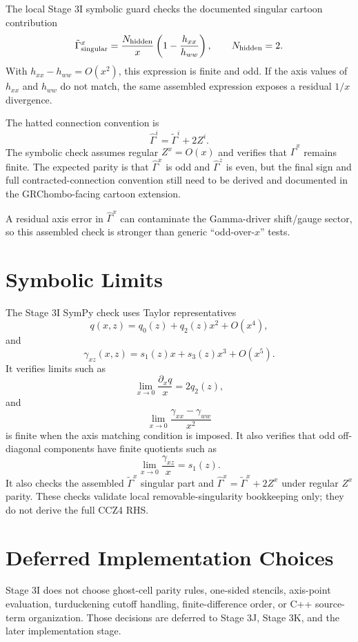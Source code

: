 \documentclass[11pt]{article}
\begin{document}
The local Stage 3I symbolic guard checks the documented singular cartoon
contribution
\[
  \tilde{\Gamma}^x_{\rm singular}
  =
  \frac{N_{\rm hidden}}{x}
  \left(1-\frac{h_{xx}}{h_{ww}}\right),
  \qquad
  N_{\rm hidden}=2.
\]
With \(h_{xx}-h_{ww}=O(x^2)\), this expression is finite and odd. If the
axis values of \(h_{xx}\) and \(h_{ww}\) do not match, the same assembled
expression exposes a residual \(1/x\) divergence.

The hatted connection convention is
\[
  \hat{\Gamma}^i
  =
  \tilde{\Gamma}^i+2Z^i.
\]
The symbolic check assumes regular \(Z^x=O(x)\) and verifies that
\(\hat{\Gamma}^x\) remains finite. The expected parity is that
\(\hat{\Gamma}^x\) is odd and \(\hat{\Gamma}^z\) is even, but the final sign
and full contracted-connection convention still need to be derived and
documented in the GRChombo-facing cartoon extension.

A residual axis error in \(\hat{\Gamma}^x\) can contaminate the Gamma-driver
shift/gauge sector, so this assembled check is stronger than generic
``odd-over-\(x\)'' tests.

\section{Symbolic Limits}

The Stage 3I SymPy check uses Taylor representatives
\[
  q(x,z)=q_0(z)+q_2(z)x^2+O(x^4),
\]
and
\[
  \gamma_{xz}(x,z)=s_1(z)x+s_3(z)x^3+O(x^5).
\]
It verifies limits such as
\[
  \lim_{x\to0}\frac{\partial_x q}{x}=2q_2(z),
\]
and
\[
  \lim_{x\to0}\frac{\gamma_{xx}-\gamma_{ww}}{x^2}
\]
is finite when the axis matching condition is imposed. It also verifies that
odd off-diagonal components have finite quotients such as
\[
  \lim_{x\to0}\frac{\gamma_{xz}}{x}=s_1(z).
\]
It also checks the assembled \(\tilde{\Gamma}^x\) singular part and
\(\hat{\Gamma}^x=\tilde{\Gamma}^x+2Z^x\) under regular \(Z^x\) parity. These
checks validate local removable-singularity bookkeeping only; they do not
derive the full CCZ4 RHS.

\section{Deferred Implementation Choices}

Stage 3I does not choose ghost-cell parity rules, one-sided stencils,
axis-point evaluation, turduckening cutoff handling, finite-difference order,
or C++ source-term organization. Those decisions are deferred to Stage 3J,
Stage 3K, and the later implementation stage.
\end{document}
